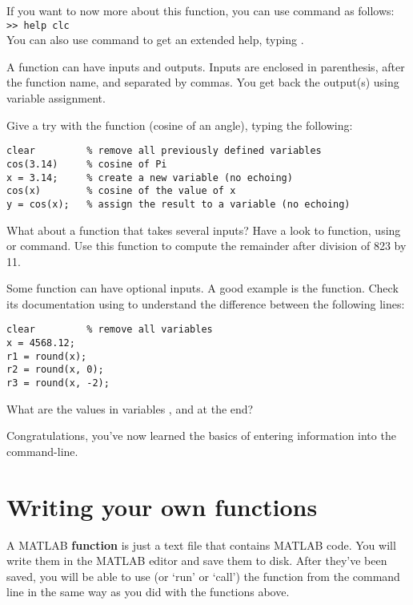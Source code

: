 \documentclass{article}
\begin{document}
If you want to now more about this function, you can use  command as follows: \\
\verb|>> help clc| \\
You can also use  command to get an extended help, typing .

A function can have inputs and outputs.
Inputs are enclosed in parenthesis, after the function name, and separated by commas.
You get back the output(s) using variable assignment.

Give a try with the  function (cosine of an angle), typing the following:
\begin{lstlisting}
clear         % remove all previously defined variables
cos(3.14)     % cosine of Pi
x = 3.14;     % create a new variable (no echoing)
cos(x)        % cosine of the value of x
y = cos(x);   % assign the result to a variable (no echoing)
\end{lstlisting}

What about a function that takes several inputs?
Have a look to  function, using  or  command.
Use this function to compute the remainder after division of 823 by 11.

Some function can have optional inputs.
A good example is the  function.
Check its documentation using  to understand the difference between the following lines:
\begin{lstlisting}
clear         % remove all variables
x = 4568.12;
r1 = round(x);
r2 = round(x, 0);
r3 = round(x, -2);
\end{lstlisting}
What are the values in variables ,  and  at the end?

Congratulations, you've now learned the basics of entering information into the command-line.

\section{Writing your own functions}

A MATLAB \textbf{function} is just a text file that contains MATLAB code.
You will write them in the MATLAB editor and save them to disk.
After they've been saved, you will be able to use (or `run' or `call') the function from the command line in the same way as you did with the functions above.
\end{document}
